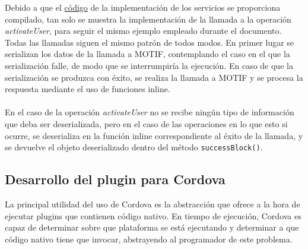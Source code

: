\documentclass[a4paper, 12pt]{article}
\begin{document}
\bigbreak
Debido a que el \hyperref[code:ios-implementation]{código} de la implementación de los servicios se proporciona compilado, tan solo se muestra la implementación de la llamada a la operación \emph{activateUser},
para seguir el mismo ejemplo empleado durante el documento. Todas las llamadas siguen el mismo patrón de todos modos. En primer lugar se serializan los datos de la llamada a MOTIF, contemplando el caso en
el que la serialización falle, de modo que se interrumpiría la ejecución. En caso de que la serialización se produzca con éxito, se realiza la llamada a MOTIF y se procesa la respuesta mediante el uso de
funciones inline.
\\
\\
En el caso de la operación \emph{activateUser} no se recibe ningún tipo de información que deba ser deserializada, pero en el caso de las operaciones en lo que esto si ocurre, se deserializa en la función inline
correspondiente al éxito de la llamada, y se devuelve el objeto deserializado dentro del método \verb~successBlock()~.
\subsection{Desarrollo del plugin para Cordova}
\label{sec-4-3}
La principal utilidad del uso de Cordova es la abstracción que ofrece a la hora de ejecutar plugins que contienen código nativo. En tiempo de ejecución, Cordova es capaz de determinar sobre que plataforma
se está ejecutando y determinar a que código nativo tiene que invocar, abstrayendo al programador de este problema.
\end{document}
